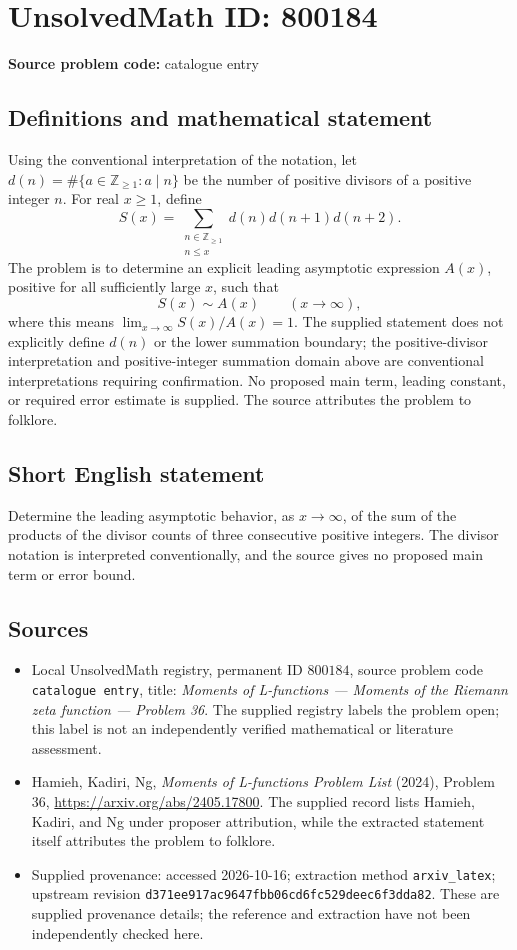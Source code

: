 \documentclass[11pt]{article}
\newcommand{\Z}{\mathbb{Z}}
\begin{document}
\section*{UnsolvedMath ID: 800184}
\textbf{Source problem code:} catalogue entry
\subsection{Definitions and mathematical statement}
Using the conventional interpretation of the notation, let \(d(n)=\#\{a\in\Z_{\geq 1}:a\mid n\}\) be the number of positive divisors of a positive integer \(n\). For real \(x\geq 1\), define
\[
S(x)=\sum_{\substack{n\in\Z_{\geq 1}\\ n\leq x}}d(n)d(n+1)d(n+2).
\]
The problem is to determine an explicit leading asymptotic expression \(A(x)\), positive for all sufficiently large \(x\), such that
\[
S(x)\sim A(x)\qquad(x\to\infty),
\]
where this means \(\lim_{x\to\infty}S(x)/A(x)=1\). The supplied statement does not explicitly define \(d(n)\) or the lower summation boundary; the positive-divisor interpretation and positive-integer summation domain above are conventional interpretations requiring confirmation. No proposed main term, leading constant, or required error estimate is supplied. The source attributes the problem to folklore.
\subsection{Short English statement}
Determine the leading asymptotic behavior, as \(x\to\infty\), of the sum of the products of the divisor counts of three consecutive positive integers. The divisor notation is interpreted conventionally, and the source gives no proposed main term or error bound.
\subsection{Sources}
\begin{itemize}
\item Local UnsolvedMath registry, permanent ID \(800184\), source problem code \texttt{catalogue entry}, title: \emph{Moments of L-functions --- Moments of the Riemann zeta function --- Problem 36}. The supplied registry labels the problem open; this label is not an independently verified mathematical or literature assessment.
\item Hamieh, Kadiri, Ng, \emph{Moments of L-functions Problem List} (2024), Problem 36, \url{https://arxiv.org/abs/2405.17800}. The supplied record lists Hamieh, Kadiri, and Ng under proposer attribution, while the extracted statement itself attributes the problem to folklore.
\item Supplied provenance: accessed 2026-10-16; extraction method \texttt{arxiv\_latex}; upstream revision \texttt{d371ee917ac9647fbb06cd6fc529deec6f3dda82}. These are supplied provenance details; the reference and extraction have not been independently checked here.
\end{itemize}
\end{document}
